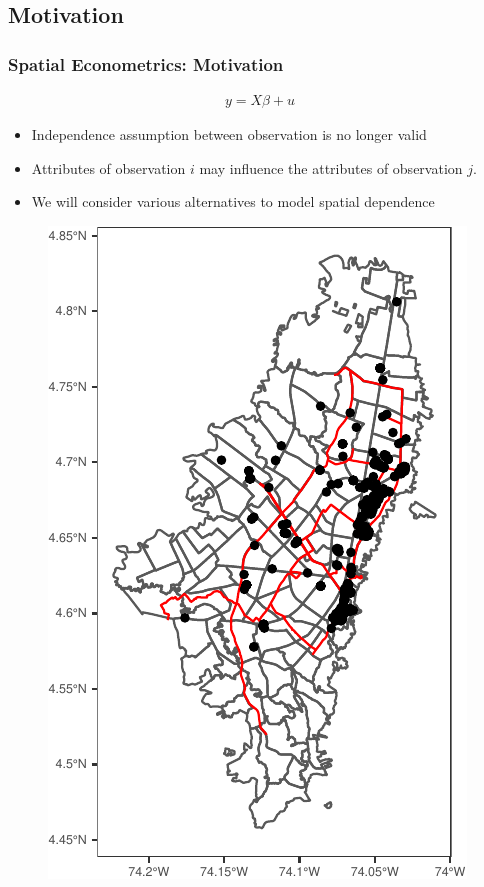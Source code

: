 \documentclass[
  shownotes,
  xcolor={svgnames},
  hyperref={colorlinks,citecolor=DarkBlue,linkcolor=DarkRed,urlcolor=DarkBlue}
   , aspectratio=169]{beamer}
\begin{document}
\subsection{Motivation}
\begin{frame}[fragile]
\frametitle{Spatial Econometrics: Motivation}


\begin{minipage}[t]{0.52\linewidth}

\begin{align}
        y = X\beta + u \nonumber
    \end{align}
\begin{itemize}
    
  
  \small
  \item Independence assumption between observation is no longer valid
  \medskip
  \item Attributes of observation $i$  may influence the attributes of observation $j$.
  \medskip
  \item We will consider various alternatives to model spatial dependence
  
  
\end{itemize}

    \end{minipage}
    \hfill
    \begin{minipage}[t]{0.43\linewidth}%
       \medskip
        \begin{figure}[H] \centering
            \captionsetup{justification=centering}
\includegraphics[scale=0.6]{figures/restaurants_bogota.pdf}


\end{figure}
\end{minipage}
\end{frame}
\end{document}
